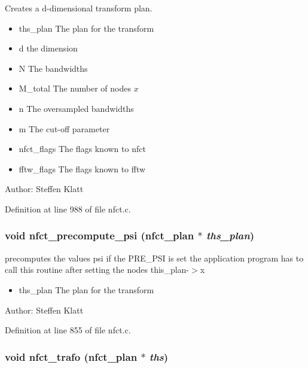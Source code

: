 Creates a d-dimensional transform plan. 

\begin{itemize}
\item ths\_\-plan The plan for the transform \item d the dimension \item N The bandwidths \item M\_\-total The number of nodes $x$ \item n The oversampled bandwidths \item m The cut-off parameter \item nfct\_\-flags The flags known to nfct \item fftw\_\-flags The flags known to fftw\end{itemize}
\begin{Desc}
\item[Author:]Steffen Klatt \end{Desc}


Definition at line 988 of file nfct.c.\hypertarget{group__nfsct_g2792eada84d4d363e308825dc40c2e6d}{
\subsubsection{\setlength{\rightskip}{0pt plus 5cm}void nfct\_\-precompute\_\-psi ({\bf nfct\_\-plan} $\ast$ {\em ths\_\-plan})}}
\label{group__nfsct_g2792eada84d4d363e308825dc40c2e6d}


precomputes the values psi if the PRE\_\-PSI is set the application program has to call this routine after setting the nodes this\_\-plan-$>$x 

\begin{itemize}
\item ths\_\-plan The plan for the transform\end{itemize}
\begin{Desc}
\item[Author:]Steffen Klatt \end{Desc}


Definition at line 855 of file nfct.c.\hypertarget{group__nfsct_g73327e4f32328dcae3e9f86572a0e15a}{
\subsubsection{\setlength{\rightskip}{0pt plus 5cm}void nfct\_\-trafo ({\bf nfct\_\-plan} $\ast$ {\em ths})}}
\label{group__nfsct_g73327e4f32328dcae3e9f86572a0e15a}


